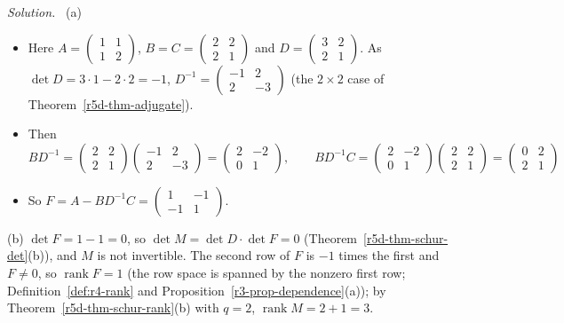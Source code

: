 \documentclass[12pt]{article}
\DeclareMathOperator{\rank}{rank}
\theoremstyle{definition}
\newenvironment{solution}{\par\noindent\textit{Solution.}\ }{\par\smallskip}
\begin{document}
\begin{solution}
(a)
\begin{itemize}
\item Here \(A=\left(\begin{smallmatrix}1&1\\1&2\end{smallmatrix}\right)\),
\(B=C=\left(\begin{smallmatrix}2&2\\2&1\end{smallmatrix}\right)\) and
\(D=\left(\begin{smallmatrix}3&2\\2&1\end{smallmatrix}\right)\). As \(\det D=3\cdot1-2\cdot2=-1\),
\(D^{-1}=\left(\begin{smallmatrix}-1&2\\2&-3\end{smallmatrix}\right)\) (the \(2\times2\) case of
Theorem~\ref{r5d-thm-adjugate}).
\item Then
\[
BD^{-1}=\begin{pmatrix}2&2\\2&1\end{pmatrix}\begin{pmatrix}-1&2\\2&-3\end{pmatrix}=\begin{pmatrix}2&-2\\0&1\end{pmatrix},\qquad
BD^{-1}C=\begin{pmatrix}2&-2\\0&1\end{pmatrix}\begin{pmatrix}2&2\\2&1\end{pmatrix}=\begin{pmatrix}0&2\\2&1\end{pmatrix}
\]
\item So \(F=A-BD^{-1}C=\left(\begin{smallmatrix}1&-1\\-1&1\end{smallmatrix}\right)\).
\end{itemize}

(b) \(\det F=1-1=0\), so \(\det M=\det D\cdot\det F=0\) (Theorem~\ref{r5d-thm-schur-det}(b)), and \(M\) is not
invertible. The second row of \(F\) is \(-1\) times the first and \(F\ne0\), so \(\rank F=1\) (the row space is
spanned by the nonzero first row; Definition~\ref{def:r4-rank} and Proposition~\ref{r3-prop-dependence}(a)); by
Theorem~\ref{r5d-thm-schur-rank}(b) with \(q=2\), \(\rank M=2+1=3\).


\end{solution}
\end{document}
